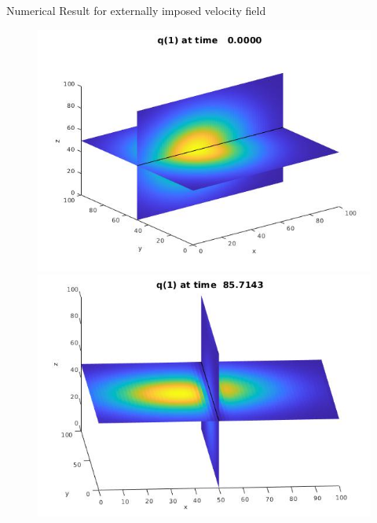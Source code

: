 \begin{frame}{Numerical Result for externally imposed velocity field}
    	\begin{figure}[H]
    		\centering
    		\begin{minipage}{0.32\textwidth}
    			\includegraphics[width=\linewidth]{Bilder_3D/1Glocke_wxi=wyj=1_wzk=0_2Cluster_t=0}
    		\end{minipage}
    		\hfill 
    		\begin{minipage}{0.32\textwidth}
    			\includegraphics[width=\linewidth]{Bilder_3D/1Glocke_wxi=wyj=1_wzk=0_2Cluster_t=85}
    		\end{minipage}
    		\hfill 
    		\begin{minipage}{0.32\textwidth}

\end{minipage}
\end{figure}
\end{frame}
